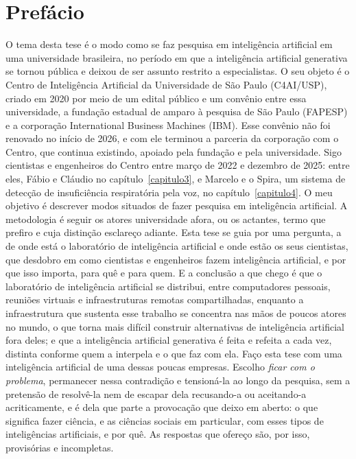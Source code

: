 \chapter*{Prefácio}

O tema desta tese é o modo como se faz pesquisa em inteligência artificial em uma universidade brasileira, no período em que a inteligência artificial generativa se tornou pública e deixou de ser assunto restrito a especialistas. O seu objeto é o Centro de Inteligência Artificial da Universidade de São Paulo (C4AI/USP), criado em 2020 por meio de um edital público e um convênio entre essa universidade, a fundação estadual de amparo à pesquisa de São Paulo (FAPESP) e a corporação International Business Machines (IBM). Esse convênio não foi renovado no início de 2026, e com ele terminou a parceria da corporação com o Centro, que continua existindo, apoiado pela fundação e pela universidade. Sigo cientistas e engenheiros do Centro entre março de 2022 e dezembro de 2025: entre eles, Fábio e Cláudio no capítulo~\ref{capitulo3}, e Marcelo e o Spira, um sistema de detecção de insuficiência respiratória pela voz, no capítulo~\ref{capitulo4}. O meu objetivo é descrever modos situados de fazer pesquisa em inteligência artificial. A metodologia é seguir os atores universidade afora, ou os actantes, termo que prefiro e cuja distinção esclareço adiante. Esta tese se guia por uma pergunta, a de onde está o laboratório de inteligência artificial e onde estão os seus cientistas, que desdobro em como cientistas e engenheiros fazem inteligência artificial, e por que isso importa, para quê e para quem. E a conclusão a que chego é que o laboratório de inteligência artificial se distribui, entre computadores pessoais, reuniões virtuais e infraestruturas remotas compartilhadas, enquanto a infraestrutura que sustenta esse trabalho se concentra nas mãos de poucos atores no mundo, o que torna mais difícil construir alternativas de inteligência artificial fora deles; e que a inteligência artificial generativa é feita e refeita a cada vez, distinta conforme quem a interpela e o que faz com ela. Faço esta tese com uma inteligência artificial de uma dessas poucas empresas. Escolho \textit{ficar com o problema}, permanecer nessa contradição e tensioná-la ao longo da pesquisa, sem a pretensão de resolvê-la nem de escapar dela recusando-a ou aceitando-a acriticamente, e é dela que parte a provocação que deixo em aberto: o que significa fazer ciência, e as ciências sociais em particular, com esses tipos de inteligências artificiais, e por quê. As respostas que ofereço são, por isso, provisórias e incompletas.

